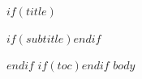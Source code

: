 \documentclass[12pt,openany]{book}
\begin{document}
$if(title)$
\begin{titlepage}\centering\vspace*{0.22\textheight}{\Huge\bfseries $title$\par}$if(subtitle)$\vspace{1em}{\Large $subtitle$\par}$endif$\vfill\end{titlepage}
$endif$
$if(toc)$\tableofcontents\clearpage$endif$
$body$
\end{document}

